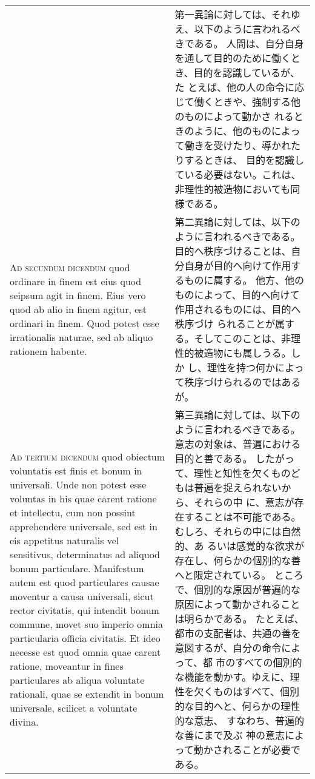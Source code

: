 \documentclass[10pt]{jsarticle} %
\begin{document}
\begin{longtable}{p{21em}p{21em}}
&


 第一異論に対しては、それゆえ、以下のように言われるべきである。
 人間は、自分自身を通して目的のために働くとき、目的を認識しているが、た
 とえば、他の人の命令に応じて働くときや、強制する他のものによって動かさ
 れるときのように、他のものによって働きを受けたり、導かれたりするときは、
 目的を認識している必要はない。これは、非理性的被造物においても同様である。

\\


{\scshape Ad secundum dicendum} quod ordinare in
finem est eius quod seipsum agit in finem. Eius vero quod ab alio in
finem agitur, est ordinari in finem. Quod potest esse irrationalis
naturae, sed ab aliquo rationem habente.


&


 第二異論に対しては、以下のように言われるべきである。
 目的へ秩序づけることは、自分自身が目的へ向けて作用するものに属する。
 他方、他のものによって、目的へ向けて作用されるものには、目的へ秩序づけ
 られることが属する。そしてこのことは、非理性的被造物にも属しうる。しか
 し、理性を持つ何かによって秩序づけられるのではあるが。

\\


{\scshape Ad tertium dicendum} quod obiectum
voluntatis est finis et bonum in universali. Unde non potest esse
voluntas in his quae carent ratione et intellectu, cum non possint
apprehendere universale, sed est in eis appetitus naturalis vel
sensitivus, determinatus ad aliquod bonum particulare. Manifestum autem
est quod particulares causae moventur a causa universali, sicut rector
civitatis, qui intendit bonum commune, movet suo imperio omnia
particularia officia civitatis. Et ideo necesse est quod omnia quae
carent ratione, moveantur in fines particulares ab aliqua voluntate
rationali, quae se extendit in bonum universale, scilicet a voluntate
divina.


&

第三異論に対しては、以下のように言われるべきである。
意志の対象は、普遍における目的と善である。
したがって、理性と知性を欠くものどもは普遍を捉えられないから、それらの中
 に、意志が存在することは不可能である。むしろ、それらの中には自然的、あ
 るいは感覚的な欲求が存在し、何らかの個別的な善へと限定されている。
ところで、個別的な原因が普遍的な原因によって動かされることは明らかである。
 たとえば、都市の支配者は、共通の善を意図するが、自分の命令によって、都
 市のすべての個別的な機能を動かす。ゆえに、理性を欠くものはすべて、個別
 的な目的へと、何らかの理性的な意志、
 すなわち、普遍的な善にまで及ぶ
神の意志によって動かされることが必要である。




\end{longtable}
\newpage
\end{document}
